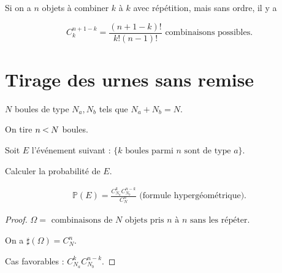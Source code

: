 \documentclass[french]{book}
\theoremstyle{definition}
\theoremstyle{remark}
\newtheorem{exo}{Exercice}
\newcommand{\lesss}{\rotatebox[origin=c]{90}{$\land$}}
\newcommand{\less}{\ \lesss\ }
\begin{document}

Si on a $n$ objets à combiner $k$ à $k$ avec répétition, mais sans ordre, il y a

\begin{equation}
  C _{k} ^{n+1-k} = \frac{(n+1-k)!}{k!(n-1)!} \text{ combinaisons possibles.}
\end{equation}




\section{Tirage des urnes sans remise}

$N$ boules de type $N_a, N_b$ tels que $N_a + N_b = N$.

On tire $n \less N$ boules.

Soit $E$ l'événement suivant : $\{ k \text{ boules parmi } n \text{ sont de type } a \}$.

Calculer la probabilité de $E$.

\begin{gather*}
  \mathbb{P}( E ) = \frac{C _{N_a} ^{k} C _{N_b} ^{n-k}}{C_N ^{n}} \text{ (formule hypergéométrique).}
\end{gather*}

\begin{proof}
  $\Omega = \text{ combinaisons de } N \text{ objets pris } n \text{ à } n \text{ sans les répéter. }   $

  On a $\sharp(\Omega) = C_N ^{n}$.

  Cas favorables : $C _{N_a} ^{k} C _{N_b}^{n-k}$.
\end{proof}
\end{document}
